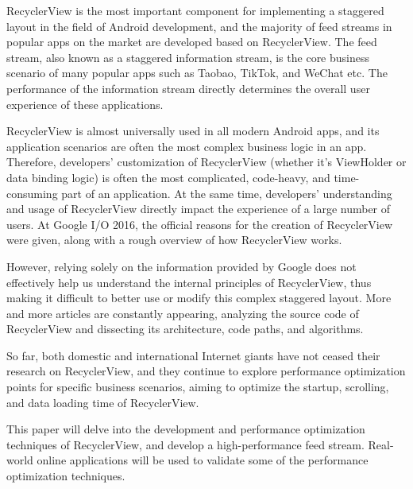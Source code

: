 RecyclerView\cite{test} is the most important component for implementing a staggered layout in the field of Android development, and the majority of feed streams in popular apps on the market are developed based on RecyclerView. The feed stream, also known as a staggered information stream, is the core business scenario of many popular apps such as Taobao, TikTok, and WeChat etc. The performance of the information stream directly determines the overall user experience of these applications.

RecyclerView is almost universally used in all modern Android apps, and its application scenarios are often the most complex business logic in an app. Therefore, developers' customization of RecyclerView (whether it's ViewHolder or data binding logic) is often the most complicated, code-heavy, and time-consuming part of an application. At the same time, developers' understanding and usage of RecyclerView directly impact the experience of a large number of users. At Google I/O 2016, the official reasons for the creation of RecyclerView were given, along with a rough overview of how RecyclerView works.

However, relying solely on the information provided by Google does not effectively help us understand the internal principles of RecyclerView, thus making it difficult to better use or modify this complex staggered layout. More and more articles are constantly appearing, analyzing the source code of RecyclerView and dissecting its architecture, code paths, and algorithms.

So far, both domestic and international Internet giants have not ceased their research on RecyclerView, and they continue to explore performance optimization points for specific business scenarios, aiming to optimize the startup, scrolling, and data loading time of RecyclerView.

This paper will delve into the development and performance optimization techniques of RecyclerView, and develop a high-performance feed stream. Real-world online applications will be used to validate some of the performance optimization techniques.